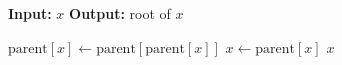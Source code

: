 \begin{algorithm}[H]
\caption{\textsc{Find}}
\label{alg:find}
\begin{algorithmic}[1]
\State \textbf{Input:} $x$ 
\State \textbf{Output:} root of $x$

        \State $\text{parent}[x] \gets \text{parent}[\text{parent}[x]]$ 
        \State $x \gets \text{parent}[x]$
    \EndWhile
    \State \Return $x$


\end{algorithmic}
\end{algorithm}

